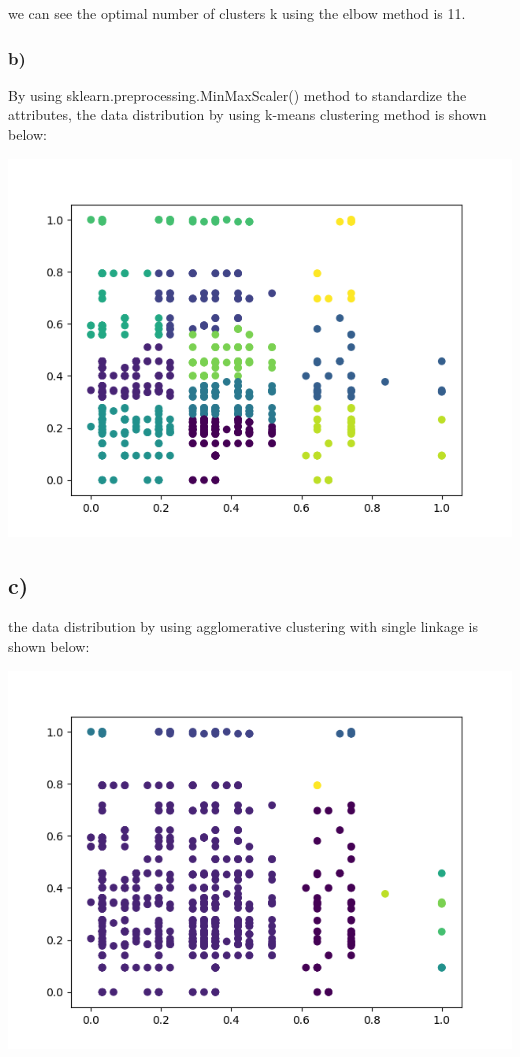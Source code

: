 \documentclass{article}
\begin{document}
we can see the optimal number of clusters k using the elbow method is 11.

\subsubsection{b)}

By using sklearn.preprocessing.MinMaxScaler() method to standardize the attributes, the data distribution by using k-means clustering method is shown below:

\includegraphics[scale=0.6]{data_scatter_plot.png}

\subsection{c)}

the data distribution by using agglomerative clustering with single linkage is shown below:

\includegraphics[scale=0.6]{AgglomerativeClustering_plot.png}
\end{document}
